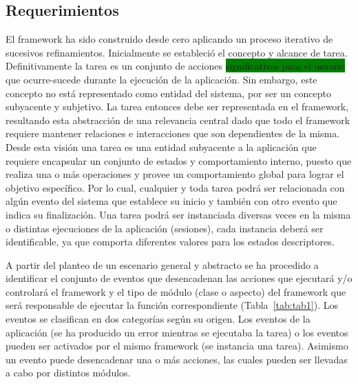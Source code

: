 \subsection{Requerimientos}
\label{subsec:requerimientos}
El framework ha sido construido desde cero aplicando un proceso iterativo de sucesivos refinamientos. Inicialmente se estableció el concepto y alcance de tarea. Definitivamente la tarea es un conjunto de acciones \colorbox{green}{significativas para el usuario} que ocurre-sucede durante la ejecución de la aplicación. Sin embargo, este concepto no está representado como entidad del sistema, por ser un concepto subyacente y subjetivo. La tarea entonces debe ser representada en el framework, resultando esta abstracción de una relevancia central dado que todo el framework requiere mantener relaciones e interacciones que son dependientes de la misma. Desde esta visión una  tarea es una entidad subyacente a la aplicación que requiere encapsular un conjunto de estados y comportamiento interno,  puesto que realiza una o más operaciones y provee un comportamiento global para lograr el objetivo específico. Por lo cual, cualquier y toda tarea podrá ser relacionada con algún evento del sistema que establece su inicio y también con otro evento que indica su finalización. Una tarea podrá ser instanciada diversas veces en la misma o distintas ejecuciones de la aplicación (sesiones), cada instancia deberá ser identificable, ya que comporta diferentes valores para los estados descriptores. 

A partir del planteo de un escenario general y abstracto se ha procedido a identificar el conjunto de eventos que desencadenan las acciones que ejecutará y/o controlará el framework y el tipo de módulo (clase o aspecto) del framework que será responsable de ejecutar la función correspondiente (Tabla~\ref{tab:tab1}).  Los  eventos se clasifican en dos categorías según su origen. Los eventos de la aplicación (se ha producido un error mientras se ejecutaba la tarea) o los eventos pueden ser activados  por el mismo framework (se instancia una tarea). Asimismo un evento puede desencadenar una o más acciones, las cuales pueden ser llevadas a cabo por distintos módulos. 

